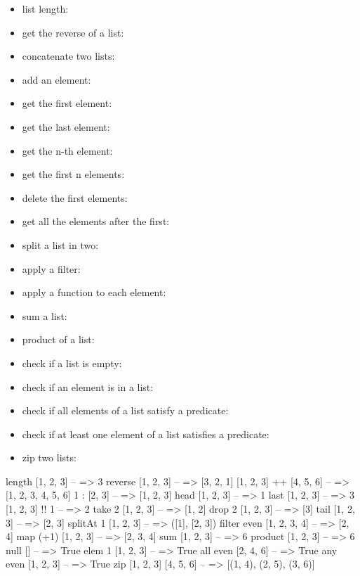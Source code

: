 \documentclass[a4paper,landscape,10pt]{article}
\begin{document}
\begin{multicols*}{2}
  \begin{itemize}
    \item list length: 
    \item get the reverse of a list: 
    \item concatenate two lists: 
    \item add an element: 
    \item get the first element: 
    \item get the last element: 
    \item get the n-th element: 
    \item get the first n elements: 
    \item delete the first  elements: 
    \item get all the elements after the first: 
    \item split a list in two: 
    \item apply a filter: 
    \item apply a function to each element: 
    \item sum a list: 
    \item product of a list: 
    \item check if a list is empty: 
    \item check if an element is in a list: 
    \item check if all elements of a list satisfy a predicate: 
    \item check if at least one element of a list satisfies a predicate: 
    \item zip two lists: 
  \end{itemize}

  \begin{haskell}
length [1, 2, 3] -- => 3
reverse [1, 2, 3] -- => [3, 2, 1]
[1, 2, 3] ++ [4, 5, 6] -- => [1, 2, 3, 4, 5, 6]
1 : [2, 3] -- => [1, 2, 3]
head [1, 2, 3] -- => 1
last [1, 2, 3] -- => 3
[1, 2, 3] !! 1 -- => 2
take 2 [1, 2, 3] -- => [1, 2]
drop 2 [1, 2, 3] -- => [3]
tail [1, 2, 3] -- => [2, 3]
splitAt 1 [1, 2, 3] -- => ([1], [2, 3])
filter even [1, 2, 3, 4] -- => [2, 4]
map (+1) [1, 2, 3] -- => [2, 3, 4]
sum [1, 2, 3] -- => 6
product [1, 2, 3] -- => 6
null [] -- => True
elem 1 [1, 2, 3] -- => True
all even [2, 4, 6] -- => True
any even [1, 2, 3] -- => True
zip [1, 2, 3] [4, 5, 6] -- => [(1, 4), (2, 5), (3, 6)]
\end{haskell}


\end{multicols*}
\end{document}
